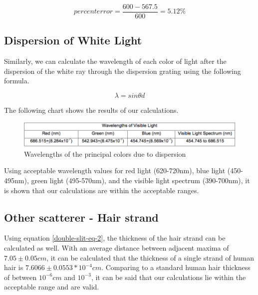 \documentclass{article}
\begin{document}
\begin{equation}
    \label{percent-error-diffraction-grating}
    percent error = \frac{600-567.5}{600} = 5.12\%
\end{equation}

\subsection{Dispersion of White Light}

Similarly, we can calculate the wavelength of each color of light after the
dispersion of the white ray through the dispersion grating using the following
formula.

\begin{equation}
    \label{dispersion-white-light}
    \lambda = sin\theta d
\end{equation}

The following chart shows the results of our calculations.

\begin{figure}[H]
    \centering
    \includegraphics[width=\textwidth]{charts/white-dispersion-chart}
    \caption{Wavelengths of the principal colors due to dispersion}
    \label{white-dispersion-chart}
\end{figure}

Using acceptable wavelength values for red light (620-720nm), blue light
(450-495nm), green light (495-570nm), and the visible light spectrum
(390-700nm), it is shown that our calculations are within the acceptable
ranges.

\subsection{Other scatterer - Hair strand}

Using equation \ref{double-slit-eq-2}, the thickness of the hair strand can be
calculated as well. With an average distance between adjacent maxima of $7.05
\pm 0.05 cm$, it can be calculated that the thickness of a single strand of
human hair is $7.6066 \pm 0.0553 * 10^{-4} cm$. Comparing to a standard human
hair thickness of between $10^{-6} cm$ and $10^{-3}$, it can be said that our
calculations lie within the acceptable range and are valid.
\end{document}
